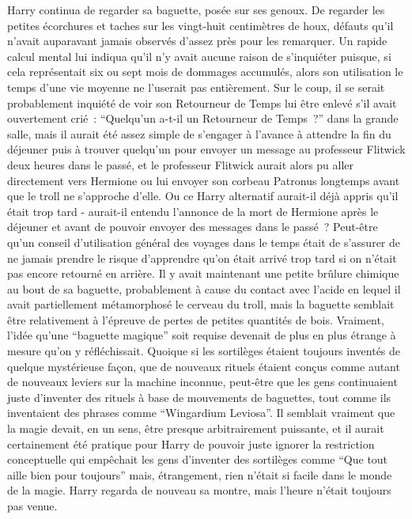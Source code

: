 Harry continua de regarder sa baguette, posée sur ses genoux. De regarder les petites écorchures et taches sur les vingt-huit centimètres de houx, défauts qu'il n'avait auparavant jamais observés d'assez près pour les remarquer. Un rapide calcul mental lui indiqua qu'il n'y avait aucune raison de s'inquiéter puisque, si cela représentait six ou sept mois de dommages accumulés, alors son utilisation le temps d'une vie moyenne ne l'userait pas entièrement. Sur le coup, il se serait probablement inquiété de voir son Retourneur de Temps lui être enlevé s'il avait ouvertement crié~: “Quelqu'un a-t-il un Retourneur de Temps~?” dans la grande salle, mais il aurait été assez simple de s'engager à l'avance à attendre la fin du déjeuner puis à trouver quelqu'un pour envoyer un message au professeur Flitwick deux heures dans le passé, et le professeur Flitwick aurait alors pu aller directement vers Hermione ou lui envoyer son corbeau Patronus longtemps avant que le troll ne s'approche d'elle. Ou ce Harry alternatif aurait-il déjà appris qu'il était trop tard - aurait-il entendu l'annonce de la mort de Hermione après le déjeuner et avant de pouvoir envoyer des messages dans le passé~? Peut-être qu'un conseil d'utilisation général des voyages dans le temps était de s'assurer de ne jamais prendre le risque d'apprendre qu'on était arrivé trop tard si on n'était pas encore retourné en arrière. Il y avait maintenant une petite brûlure chimique au bout de sa baguette, probablement à cause du contact avec l'acide en lequel il avait partiellement métamorphosé le cerveau du troll, mais la baguette semblait être relativement à l'épreuve de pertes de petites quantités de bois. Vraiment, l'idée qu'une “baguette magique” soit requise devenait de plus en plus étrange à mesure qu'on y réfléchissait. Quoique si les sortilèges étaient toujours inventés de quelque mystérieuse façon, que de nouveaux rituels étaient conçus comme autant de nouveaux leviers sur la machine inconnue, peut-être que les gens continuaient juste d'inventer des rituels à base de mouvements de baguettes, tout comme ils inventaient des phrases comme “Wingardium Leviosa”. Il semblait vraiment que la magie devait, en un sens, être presque arbitrairement puissante, et il aurait certainement été pratique pour Harry de pouvoir juste ignorer la restriction conceptuelle qui empêchait les gens d'inventer des sortilèges comme “Que tout aille bien pour toujours” mais, étrangement, rien n'était si facile dans le monde de la magie. Harry regarda de nouveau sa montre, mais l'heure n'était toujours pas venue.

